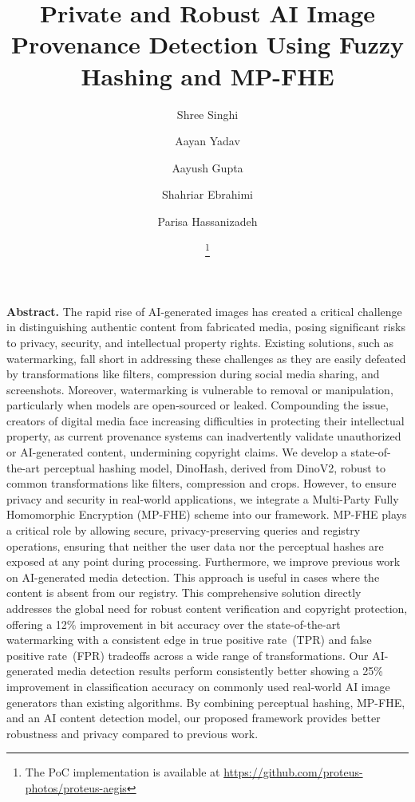 \documentclass[11pt]{article}
\title{\bf Private and Robust AI Image Provenance Detection Using Fuzzy Hashing and MP-FHE}
\author[1,2]{Shree Singhi}
\author[1,2]{Aayan Yadav}
\author[3]{Aayush Gupta}
\author[4]{Shahriar Ebrahimi}
\author[4,5]{Parisa Hassanizadeh}
\affil[1]{Zellic}
\affil[2]{Indian Institute of Technology Roorkee: \{\textit{shree\_s, aayan\_y}\} @\textit{mfs.iitr.ac.in}}
\affil[3]{ZK Email: \textit{aayushg@mit.edu}}
\affil[4]{IDEAS NCBR: \{\textit{shahriar.ebrahimi, parisa.hassanizadeh}\} @\textit{ideas-ncbr.pl}}
\affil[5]{Polish Academy of Science, Poland}
\date{\lastupdate
 \footnote{The PoC implementation is available at \protect\url{https://github.com/proteus-photos/proteus-aegis}}}
\begin{document}
\maketitle

\thispagestyle{empty}

\par\noindent
\textbf{Abstract.} The rapid rise of AI-generated images has created a critical challenge in distinguishing authentic content from fabricated media, posing significant risks to privacy, security, and intellectual property rights. Existing solutions, such as watermarking, fall short in addressing these challenges as they are easily defeated by transformations like filters, compression during social media sharing, and screenshots. Moreover, watermarking is vulnerable to removal or manipulation, particularly when models are open-sourced or leaked. Compounding the issue, creators of digital media face increasing difficulties in protecting their intellectual property, as current provenance systems can inadvertently validate unauthorized or AI-generated content, undermining copyright claims. We develop a state-of-the-art perceptual hashing model, DinoHash, derived from DinoV2, robust to common transformations like filters, compression and crops.  However, to ensure privacy and security in real-world applications, we integrate a Multi-Party Fully Homomorphic Encryption (MP-FHE) scheme into our framework. MP-FHE plays a critical role by allowing secure, privacy-preserving queries and registry operations, ensuring that neither the user data nor the perceptual hashes are exposed at any point during processing.  Furthermore, we improve previous work on AI-generated media detection. This approach is useful in cases where the content is absent from our registry. This comprehensive solution directly addresses the global need for robust content verification and copyright protection, offering a 12\% improvement in bit accuracy over the state-of-the-art watermarking with a consistent edge in true positive rate~(TPR) and false positive rate~(FPR) tradeoffs across a wide range of transformations. Our AI-generated media detection results perform consistently better showing a 25\% improvement in classification accuracy on commonly used real-world AI image generators than existing algorithms. By combining perceptual hashing, MP-FHE, and an AI content detection model, our proposed framework provides better robustness and privacy compared to previous work.

\pagebreak
\end{document}
